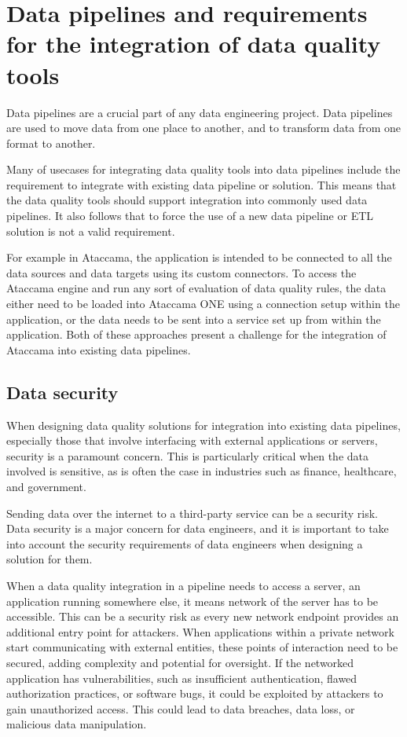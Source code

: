 \section{Data pipelines and requirements for the integration of data quality tools}

Data pipelines are a crucial part of any data engineering project. Data pipelines are used to move data from one place to another, and to transform data from one format to another. 

Many of usecases for integrating data quality tools into data pipelines include the requirement to integrate with existing data pipeline or solution. This means that the data quality tools should support integration into commonly used data pipelines. It also follows that to force the use of a new data pipeline or ETL solution is not a valid requirement. 

For example in Ataccama, the application is intended to be connected to all the data sources and data targets using its custom connectors. To access the Ataccama engine and run any sort of evaluation of data quality rules, the data either need to be loaded into Ataccama ONE using a connection setup within the application, or the data needs to be sent into a service set up from within the application. Both of these approaches present a challenge for the integration of Ataccama into existing data pipelines.

\subsection{Data security}

When designing data quality solutions for integration into existing data pipelines, especially those that involve interfacing with external applications or servers, security is a paramount concern. This is particularly critical when the data involved is sensitive, as is often the case in industries such as finance, healthcare, and government.

 Sending data over the internet to a third-party service can be a security risk. Data security is a major concern for data engineers, and it is important to take into account the security requirements of data engineers when designing a solution for them.

When a data quality integration in a pipeline needs to access a server, an application running somewhere else, it means network of the server has to be accessible. This can be a security risk as every new network endpoint provides an additional entry point for attackers. When applications within a private network start communicating with external entities, these points of interaction need to be secured, adding complexity and potential for oversight.  If the networked application has vulnerabilities, such as insufficient authentication, flawed authorization practices, or software bugs, it could be exploited by attackers to gain unauthorized access. This could lead to data breaches, data loss, or malicious data manipulation. 

